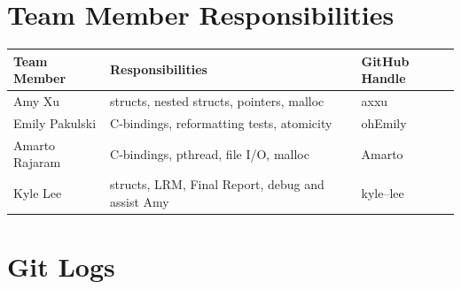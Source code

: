\section{Team Member Responsibilities}
  

  \begin{tabular}{ | l | l | l |}\hline
    Team Member  & Responsibilities      & GitHub Handle\\ \hline
    Amy Xu & structs, nested structs, pointers, malloc & axxu\\
    Emily Pakulski & C-bindings, reformatting tests, atomicity & ohEmily\\
    Amarto Rajaram & C-bindings, pthread, file I/O, malloc & Amarto\\
    Kyle Lee & structs, LRM, Final Report, debug and assist Amy & kyle--lee\\ \hline
  \end{tabular}
\newpage
\section{Git Logs}



